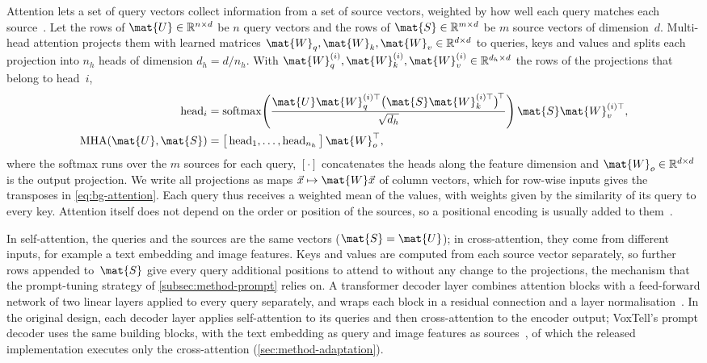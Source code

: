 Attention lets a set of query vectors collect information from a set of source vectors, weighted by how well each query matches each source~\cite{NIPS2017_3f5ee243}.
Let the rows of $\mat{U} \in \mathbb{R}^{n \times d}$ be $n$ query vectors and the rows of $\mat{S} \in \mathbb{R}^{m \times d}$ be $m$ source vectors of dimension~$d$.
Multi-head attention projects them with learned matrices $\mat{W}_q, \mat{W}_k, \mat{W}_v \in \mathbb{R}^{d \times d}$ to queries, keys and values and splits each projection into $n_h$ heads of dimension $d_h = d / n_h$.
With $\mat{W}_q^{(i)}, \mat{W}_k^{(i)}, \mat{W}_v^{(i)} \in \mathbb{R}^{d_h \times d}$ the rows of the projections that belong to head~$i$,
\begin{equation}
\begin{aligned}
\operatorname{head}_i &= \operatorname{softmax}\!\left( \frac{\mat{U}\mat{W}_q^{(i)\top} \big(\mat{S}\mat{W}_k^{(i)\top}\big)^{\!\top}}{\sqrt{d_h}} \right) \mat{S}\mat{W}_v^{(i)\top},\\
\operatorname{MHA}(\mat{U}, \mat{S}) &= \big[\operatorname{head}_1, \dots, \operatorname{head}_{n_h}\big]\, \mat{W}_o^{\top},
\end{aligned}
\label{eq:bg-attention}
\end{equation}
where the softmax runs over the $m$ sources for each query, $[\cdot]$ concatenates the heads along the feature dimension and $\mat{W}_o \in \mathbb{R}^{d \times d}$ is the output projection.
We write all projections as maps $\vec{x} \mapsto \mat{W}\vec{x}$ of column vectors, which for row-wise inputs gives the transposes in \cref{eq:bg-attention}.
Each query thus receives a weighted mean of the values, with weights given by the similarity of its query to every key.
Attention itself does not depend on the order or position of the sources, so a positional encoding is usually added to them~\cite{NIPS2017_3f5ee243}.

In self-attention, the queries and the sources are the same vectors ($\mat{S} = \mat{U}$); in cross-attention, they come from different inputs, for example a text embedding and image features.
Keys and values are computed from each source vector separately, so further rows appended to~$\mat{S}$ give every query additional positions to attend to without any change to the projections, the mechanism that the prompt-tuning strategy of \cref{subsec:method-prompt} relies on.
A transformer decoder layer combines attention blocks with a feed-forward network of two linear layers applied to every query separately, and wraps each block in a residual connection and a layer normalisation~\cite{NIPS2017_3f5ee243}.
In the original design, each decoder layer applies self-attention to its queries and then cross-attention to the encoder output; VoxTell's prompt decoder uses the same building blocks, with the text embedding as query and image features as sources~\cite[Eq.~3]{rokuss2025voxtellfreetextpromptableuniversal}, of which the released implementation executes only the cross-attention (\cref{sec:method-adaptation}).

